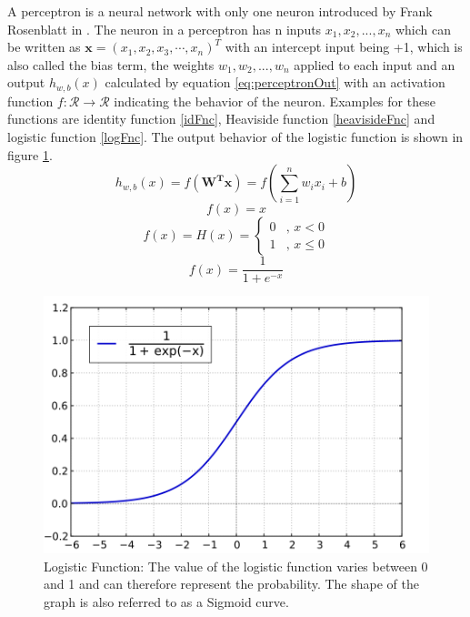 A perceptron is a neural network with only one neuron introduced by Frank Rosenblatt in \cite{perceptron}. The neuron in a perceptron has n inputs $x_1, x_2, ..., x_n$ which can be written as $\bm{x} = \left(x_1, x_2, x_3, \cdots, x_n \right)^T$ with an intercept input being +1, which is also called the bias term, the weights $w_1, w_2, ..., w_n$ applied to each input and an output $h_{w,b}(x)$ calculated by equation \eqref{eq:perceptronOut} with an activation function $f: \mathcal{R} \rightarrow \mathcal{R}$ indicating the behavior of the neuron. Examples for these functions are identity function \eqref{idFnc}, Heaviside function \eqref{heavisideFnc} and logistic function \eqref{logFnc}. The output behavior of the logistic function is shown in figure \ref{fig:logistic}. 
	\begin{equation} \label{eq:perceptronOut}
			h_{w,b}(x) = f(\bm{W^Tx}) = f(\overset{n}{\underset{i = 1}{\sum}}w_ix_i + b)
	\end{equation}
	\begin{equation} \label{idFnc}
			f(x) =  x
	\end{equation}
	\begin{equation} \label{heavisideFnc}
			f(x) =  H(x) = \left\{
		\begin{array}{ll} 
			0  & \mbox {, }x < 0 \\
			1 & \mbox {, }x  \leq 0
		\end{array}
	\right.
	\end{equation}
	\begin{equation} \label{logFnc}
			f(x) =  \frac{1}{1+e^{-x}}
	\end{equation}
	\begin{figure}[tbh]
  		\centering
    		\includegraphics[width=0.8\linewidth]{abbildungen/logFnc.png}
  		\caption{Logistic Function: The value of the logistic function varies between 0 and 1 and can therefore represent the probability. The shape of the graph is also referred to as a Sigmoid curve.}  
		\label{fig:logistic}
		\end{figure}

